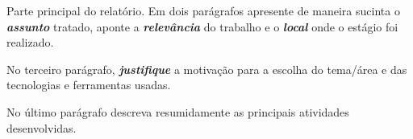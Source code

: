 Parte principal do relatório. Em dois parágrafos apresente de maneira sucinta o
\emph{\textbf{assunto}} tratado, aponte a \emph{\textbf{relevância}} do trabalho e o \emph{\textbf{local}} onde o
estágio foi realizado.

No terceiro parágrafo, \emph{\textbf{justifique}} a motivação para a escolha do tema/área e
das tecnologias e ferramentas usadas.

No último parágrafo descreva resumidamente as principais atividades
desenvolvidas.
